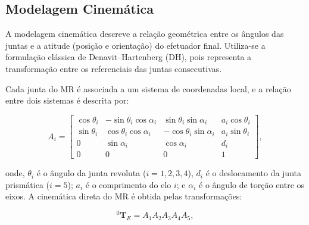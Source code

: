 \subsection{Modelagem Cinemática}

A modelagem cinemática descreve a relação geométrica entre os ângulos das juntas e a atitude (posição e orientação) do efetuador final. Utiliza-se a formulação clássica de Denavit--Hartenberg (DH), pois representa a transformação entre os referenciais das juntas consecutivas.

Cada junta do MR é associada a um sistema de coordenadas local, e a relação entre dois sistemas é descrita por:

\begin{equation}
A_i =
\begin{bmatrix}
\cos\theta_i & -\sin\theta_i \cos\alpha_i & \sin\theta_i \sin\alpha_i & a_i \cos\theta_i \\
\sin\theta_i & \cos\theta_i \cos\alpha_i & -\cos\theta_i \sin\alpha_i & a_i \sin\theta_i \\
0 & \sin\alpha_i & \cos\alpha_i & d_i \\
0 & 0 & 0 & 1
\end{bmatrix},
\end{equation}

onde, $\theta_i$ é o ângulo da junta revoluta ($i = 1,2,3,4$), $d_i$ é o deslocamento da junta prismática ($i = 5$); $a_i$ é o comprimento do elo $i$; e $\alpha_i$ é o ângulo de torção entre os eixos.
A cinemática direta do MR é obtida pelas transformações:

\begin{equation}
    \label{eq:matrizes_homogeneas_sucessivas}
{}^0 \mathbf{T}_{E} = A_1 A_2 A_3 A_4 A_5,
\end{equation}


